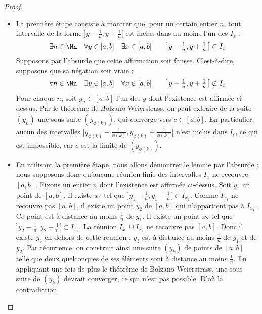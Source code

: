 \documentclass[class=report,crop=false]{standalone}
\begin{document}
\begin{proof}
\begin{itemize}
  \item La première étape consiste à montrer que, pour un
certain entier $n$, tout intervalle de la forme $\big]y-\tfrac1n,y+\tfrac1n\big[$ est
inclus dans au moins l'un des $I_x$ :
$$\exists n\in\Nn\quad\forall y\in [a,b]\quad\exists x\in[a,b]\qquad
\big]y-\tfrac1n,y+\tfrac1n\big[\subset I_x $$
Supposons par l'absurde que cette affirmation soit fausse. C'est-à-dire, supposons que sa négation soit
vraie :
$$\forall n\in\Nn\quad\exists y\in [a,b]\quad\forall x\in[a,b]\qquad
\big]y-\tfrac1n,y+\tfrac1n\big[\not\subset I_x$$
Pour chaque $n$, soit $y_n \in [a,b]$ l'un des $y$ dont l'existence est affirmée
ci-dessus. Par le théorème de Bolzano-Weierstrass, on peut
extraire de la suite $(y_n)$ une sous-suite $(y_{\phi(k)})$, qui
converge vers $c\in[a,b]$. En particulier, aucun des intervalles
$\big]y_{\phi(k)}-\frac{1}{\phi(k)},y_{\phi(k)}+\frac{1}{\phi(k)}\big[$ n'est inclus dans
$I_c$, ce qui est impossible, car $c$ est la limite de $(y_{\phi(k)})$.

  
  \item En utilisant la première étape, nous allons démontrer
le lemme par l'absurde : nous supposons donc qu'aucune réunion
finie des intervalles $I_x$ ne recouvre $[a,b]$. 
Fixons un entier $n$ dont l'existence est affirmée ci-dessus.
Soit $y_1$ un point de $[a,b]$. Il
existe $x_1$ tel que $\big]y_1-\tfrac1n,y_1+\tfrac1n\big[\subset I_{x_1}$. Comme
$I_{x_1}$ ne recouvre pas $[a,b]$, il existe un point $y_2$ de $[a,b]$
qui n'appartient pas à $I_{x_1}$. Ce point est à distance au moins
$\tfrac1n$ de $y_1$. Il existe un point $x_2$ tel que
$\big]y_2-\tfrac1n,y_2+\tfrac1n\big[\subset I_{x_2}$. La réunion $I_{x_1}\cup
I_{x_2}$ ne recouvre pas $[a,b]$. Donc il existe $y_3$ en dehors de
cette réunion : $y_3$ est à distance au moins $\tfrac1n$ de $y_1$ et 
de $y_2$. Par récurrence, on construit ainsi une suite $(y_k)$
de points de $[a,b]$ telle que deux quelconques de ses éléments sont
à distance au moins $\tfrac1n$. En appliquant une fois de plus le
théorème de Bolzano-Weierstrass, une sous-suite de $(y_k)$ devrait
converger, ce qui n'est pas possible. D'où la contradiction.
\end{itemize}
\end{proof} 
\end{document}
